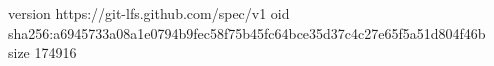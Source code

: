 version https://git-lfs.github.com/spec/v1
oid sha256:a6945733a08a1e0794b9fec58f75b45fc64bce35d37c4c27e65f5a51d804f46b
size 174916
